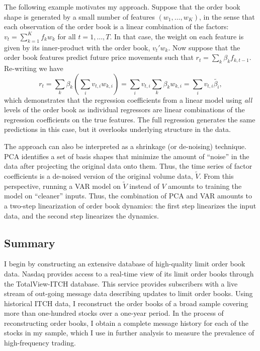 	The following example motivates my approach. Suppose that the order book shape is generated by a small number of features $(w_1, \dots, w_K)$, in the sense that each observation of the order book is a linear combination of the factors: $v_t = \sum_{k=1}^K f_k w_k$ for all $t = 1, \dots, T$. In that case, the weight on each feature is given by its inner-product with the order book, $v_t'w_k$. Now suppose that the order book features predict future price movements such that $r_t = \sum_k \beta_k f_{k, t - 1}.$ Re-writing we have
	\begin{equation}
		r_t = \sum_k \beta_k \left( \sum_i v_{t, i} w_{k, i} \right) = \sum_i v_{t,i} \sum_k \beta_k w_{k, i} = \sum_i v_{t,i} \tilde{\beta_i},
	\end{equation}
	which demonstrates that the regression coefficients from a linear model using \textit{all} levels of the order book as individual regressors are linear combinations of the regression coefficients on the true features. The full regression generates the same predictions in this case, but it overlooks underlying structure in the data.

	The approach can also be interpreted as a shrinkage (or de-noising) technique. PCA identifies a set of basis shapes that minimize the amount of ``noise'' in the data after projecting the original data onto them. Thus, the time series of factor coefficients is a de-noised version of the original volume data, $\tilde{V}$. From this perspective, running a VAR model on $\tilde{V}$ instead of $V$ amounts to training the model on ``cleaner'' inputs. Thus, the combination of PCA and VAR amounts to a two-step linearization of order book dynamics: the first step linearizes the input data, and the second step linearizes the dynamics.

	\subsection{Summary}
		I begin by constructing an extensive database of high-quality limit order book data. Nasdaq provides access to a real-time view of its limit order books through the TotalView-ITCH database. This service provides subscribers with a live stream of out-going message data describing updates to limit order books. Using historical ITCH data, I reconstruct the order books of a broad sample covering more than one-hundred stocks over a one-year period. In the process of reconstructing order books, I obtain a complete message history for each of the stocks in my sample, which I use in further analysis to measure the prevalence of high-frequency trading.


